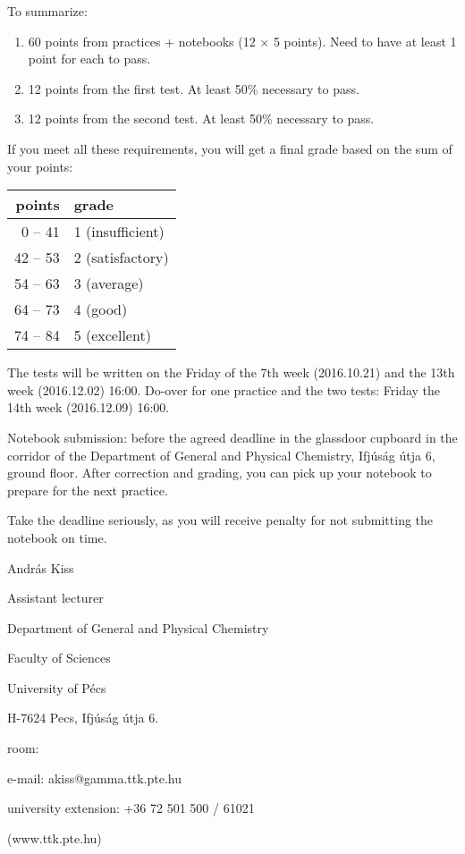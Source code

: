\documentclass{article}
\begin{document}
To summarize: 

\begin{enumerate}
\item 60 points from practices + notebooks (12 $\times$ 5 points). Need to have at least 1 point for each to pass.
\item 12 points from the first test. At least 50\% necessary to pass.
\item 12 points from the second test. At least 50\% necessary to pass. 
\end{enumerate}

If you meet all these requirements, you will get a final grade based on the sum of your points:

\begin{center}
\begin{tabular}{|r|l|}
\hline
points & grade \\
\hline
0 -- 41 & 1 (insufficient) \\
\hline
42 -- 53 & 2 (satisfactory) \\
\hline
54 -- 63 & 3 (average) \\
\hline
64 -- 73 & 4 (good) \\
\hline
74 -- 84 & 5 (excellent) \\
\hline
\end{tabular}
\end{center}

The tests will be written on the Friday of the 7th week (2016.10.21) and the 13th week (2016.12.02) 16:00. Do-over for one practice and the two tests: Friday the 14th week (2016.12.09) 16:00. 

Notebook submission: before the agreed deadline in the glassdoor cupboard in the corridor of the Department of General and Physical Chemistry, Ifjúság útja 6, ground floor. After correction and grading, you can pick up your notebook to prepare for the next practice.

Take the deadline seriously, as you will receive penalty for not submitting the notebook on time.

\vspace{10mm}

András Kiss

Assistant lecturer

Department of General and Physical Chemistry

Faculty of Sciences

University of Pécs

H-7624 Pecs, Ifjúság útja 6.

room:

e-mail: akiss@gamma.ttk.pte.hu

university extension: +36 72 501 500 / 61021

(www.ttk.pte.hu)
\end{document}
